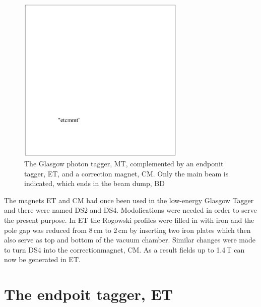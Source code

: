\begin{figure}
\begin{center}
\includegraphics[height=8cm]{./et_etcmmt.eps}
\vspace*{-1cm}
\end{center}
\caption{The Glasgow photon tagger, MT, complemented by an endponit
tagger, ET, and a correction magnet, CM. Only the main beam is indicated,
which ends in the beam dump, BD}
\label{etcmmt}
\end{figure}

The magnets ET and CM had once been used in the low-energy
Glasgow Tagger \cite{lowglatag} and there were named DS2 and DS4.
Modofications were needed in order to serve
the present purpose. In ET the Rogowski profiles were filled in with iron
and the pole gap was reduced from 8\,cm to 2\,cm by inserting two iron
plates which then also serve as top and bottom of the vacuum chamber.
Similar changes were made to turn DS4 into the correctionmagnet, CM. 
As a result fields up to 1.4\,T can now be generated in ET.

\section{The endpoit tagger, ET}

